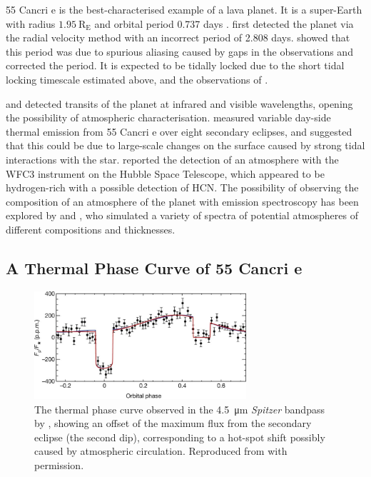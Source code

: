 55 Cancri e is the best-characterised example of a lava planet. It is a super-Earth with radius $1.95\ \mathrm{R_{E}}$ and orbital period 0.737 days \citep{crida201855cnce}. \citet{mcarthur2004detection} first detected the planet via the radial velocity method with an incorrect period of 2.808 days. \citet{dawson2010radial} showed that this period was due to spurious aliasing caused by gaps in the observations and corrected the period. It is expected to be tidally locked due to the short tidal locking timescale estimated above, and the observations of \citet{demory201655cnce}.


 \citet{demory201155cnce} and \citet{winn2011super} detected transits of the planet at infrared and visible wavelengths, opening the possibility of atmospheric characterisation.  \citet{demory2015variability} measured variable day-side thermal emission from 55 Cancri e over eight secondary eclipses, and suggested that this could be due to large-scale changes on the surface caused by strong tidal interactions with the star. \citet{tsiaras2016detection} reported the detection of an atmosphere with the WFC3 instrument on the Hubble Space Telescope, which appeared to be hydrogen-rich with a possible detection of HCN. The possibility of observing the composition of an atmosphere of the planet with emission spectroscopy has been explored by \citet{miguel2018observability} and \citet{ito2015theoretical}, who simulated a variety of spectra of potential atmospheres of different compositions and thicknesses.



\subsection{A Thermal Phase Curve of 55 Cancri e}


\begin{figure}
  \centering
  \includegraphics[width=0.7\textwidth]{figures/linking-climate-55cnce/demory-phase-curve.jpg}
\caption{The thermal phase curve observed in the \SI{4.5}{\micro\metre} \textit{Spitzer} bandpass by \citet{demory201655cnce}, showing an offset of the maximum flux from the secondary eclipse (the second dip), corresponding to a hot-spot shift possibly caused by atmospheric circulation. Reproduced from \citet{demory201655cnce} with permission.}\label{fig:review-demory-phase-curve}
\end{figure}


